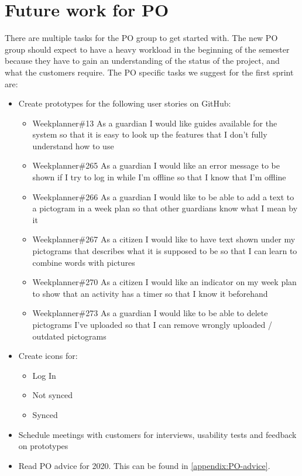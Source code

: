 \section{Future work for PO}
There are multiple tasks for the PO group to get started with.
The new PO group should expect to have a heavy workload in the beginning of the semester because they have to gain an understanding of the status of the project, and what the customers require.
The PO specific tasks we suggest for the first sprint are:

\begin{itemize}
    \item Create prototypes for the following user stories on GitHub:
    \begin{itemize}
        \item Weekplanner\#13 As a guardian I would like guides available for the system so that it is easy to look up the features that I don't fully understand how to use
        \item Weekplanner\#265 As a guardian I would like an error message to be shown if I try to log in while I'm offline so that I know that I'm offline
        \item Weekplanner\#266 As a guardian I would like to be able to add a text to a pictogram in a week plan so that other guardians know what I mean by it
        \item Weekplanner\#267 As a citizen I would like to have text shown under my pictograms that describes what it is supposed to be so that I can learn to combine words with pictures 
        \item Weekplanner\#270 As a citizen I would like an indicator on my week plan to show that an activity has a timer so that I know it beforehand
        \item Weekplanner\#273 As a guardian I would like to be able to delete pictograms I've uploaded so that I can remove wrongly uploaded / outdated pictograms 
    \end{itemize}
    \item Create icons for:
    \begin{itemize}
        \item Log In
        \item Not synced
        \item Synced
    \end{itemize}
    \item Schedule meetings with customers for interviews, usability tests and feedback on prototypes
    \item Read PO advice for 2020. This can be found in \autoref{appendix:PO-advice}.
\end{itemize}
